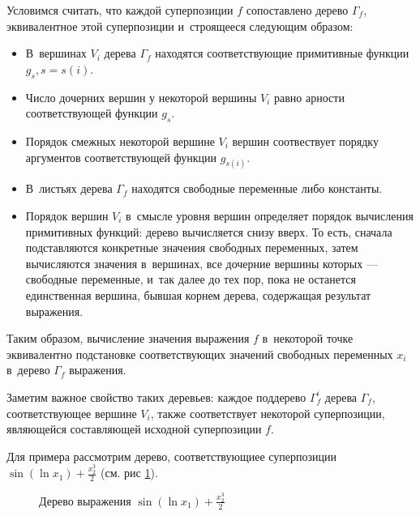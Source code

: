 \documentclass[12pt,a4paper]{amsart}
\begin{document}
Условимся считать, что каждой суперпозиции $f$ сопоставлено дерево $\Gamma_f$,
эквивалентное этой суперпозиции и~строящееся следующим образом:

\begin{itemize}
  \item В~вершинах $V_i$ дерева $\Gamma_f$ находятся соответствующие
	примитивные функции $g_s, s = s(i)$.
  \item Число дочерних вершин у некоторой вершины $V_i$ равно арности
	соответствующей функции $g_s$.
  \item Порядок смежных некоторой вершине $V_i$ вершин соотвествует порядку
	аргументов соответствующей функции $g_{s(i)}$.
  \item В~листьях дерева $\Gamma_f$ находятся свободные переменные либо
	константы.
  \item Порядок вершин $V_i$ в~смысле уровня вершин определяет порядок
	вычисления примитивных функций: дерево вычисляется снизу вверх.
	То есть, сначала подставляются конкретные значения свободных переменных,
	затем вычисляются значения в~вершинах, все дочерние вершины которых ---
	свободные переменные, и~так далее до тех пор, пока не останется
	единственная вершина, бывшая корнем дерева, содержащая результат выражения.
\end{itemize}

Таким образом, вычисление значения выражения $f$ в~некоторой точке эквивалентно
подстановке соответствующих значений свободных переменных $x_i$ в~дерево $\Gamma_f$
выражения.

Заметим важное свойство таких деревьев: каждое поддерево $\Gamma_f^i$
дерева $\Gamma_f$, соответствующее вершине $V_i$, также соответствует
некоторой суперпозиции, являющейся составляющей исходной суперпозиции $f$.

Для примера рассмотрим дерево, соответствующиее суперпозиции
$\sin (\ln x_1) + \frac{x_2^3}{2}$ (см. рис \ref{fig:expr_tree_example}).

\begin{figure}[h]
  \caption{Дерево выражения $\sin (\ln x_1) + \frac{x_2^3}{2}$}
  \label{fig:expr_tree_example}
\end{figure}
\end{document}
